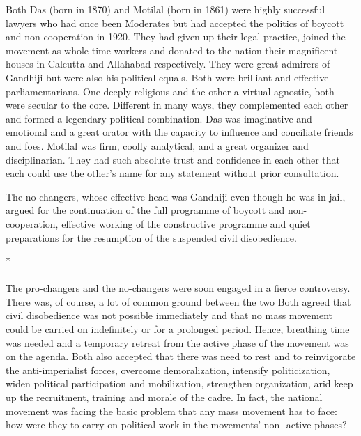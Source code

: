 Both Das (born in 1870) and Motilal (born in 1861) were highly successful lawyers who had once been Moderates but had accepted the politics of boycott and non-cooperation in 1920. They had given up their legal practice, joined the movement as whole time workers and donated to the nation their magnificent houses in Calcutta and Allahabad respectively. They were great admirers of Gandhiji but were also his political equals. Both were brilliant and effective parliamentarians. One deeply religious and the other a virtual agnostic, both were secular to the core. Different in many ways, they complemented each other and formed a legendary political combination. Das was imaginative and emotional and a great orator with the capacity to influence and conciliate friends and foes. Motilal was firm, coolly analytical, and a great organizer and disciplinarian. They had such absolute trust and confidence in each other that each could use the other's name for any statement without prior consultation.

The no-changers, whose effective head was Gandhiji even though he was in jail, argued for the continuation of the full programme of boycott and non-cooperation, effective working of the constructive programme and quiet preparations for the resumption of the suspended civil disobedience.

\begin{center}*\end{center}

\paragraph*{}


The pro-changers and the no-changers were soon engaged in a fierce controversy. There was, of course, a lot of common ground between the two Both agreed that civil disobedience was not possible immediately and that no mass movement could be carried on indefinitely or for a prolonged period. Hence, breathing time was needed and a temporary retreat from the active phase of the movement was on the agenda. Both also accepted that there was need to rest and to reinvigorate the anti-imperialist forces, overcome demoralization, intensify politicization, widen political participation and mobilization, strengthen organization, arid keep up the recruitment, training and morale of the cadre. In fact, the national movement was facing the basic problem that any mass movement has to face: how were they to carry on political work in the movements' non- active phases?

